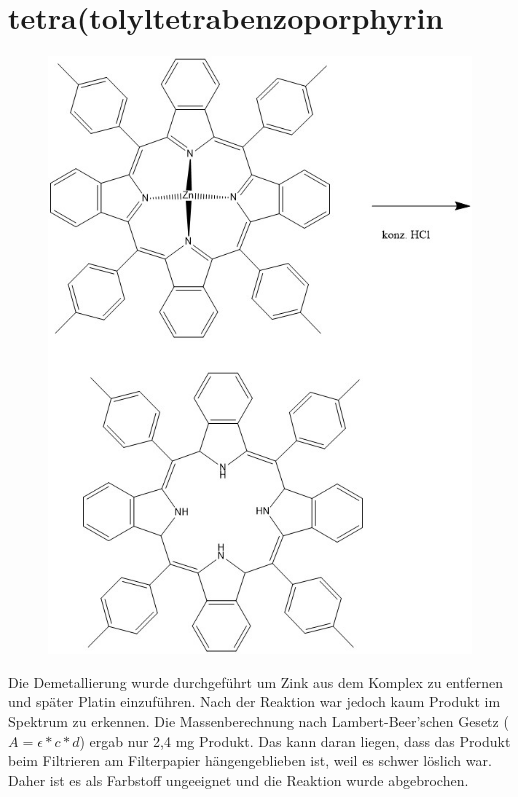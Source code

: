 \section{tetra(tolyltetrabenzoporphyrin}
\begin{figure}[!htpb]
\centering
\includegraphics[scale=0.5]{graphics/demetoftetramehtphen}
\end{figure}
Die Demetallierung wurde durchgeführt um Zink aus dem Komplex zu entfernen und später Platin einzuführen. Nach der Reaktion war jedoch kaum Produkt im Spektrum zu erkennen. Die Massenberechnung nach Lambert-Beer'schen Gesetz ($A=\epsilon*c*d$) ergab nur 2,4 mg Produkt. Das kann daran liegen, dass das Produkt beim Filtrieren am Filterpapier hängengeblieben ist, weil es schwer löslich war. Daher ist es als Farbstoff ungeeignet und die Reaktion wurde abgebrochen.
\newpage
